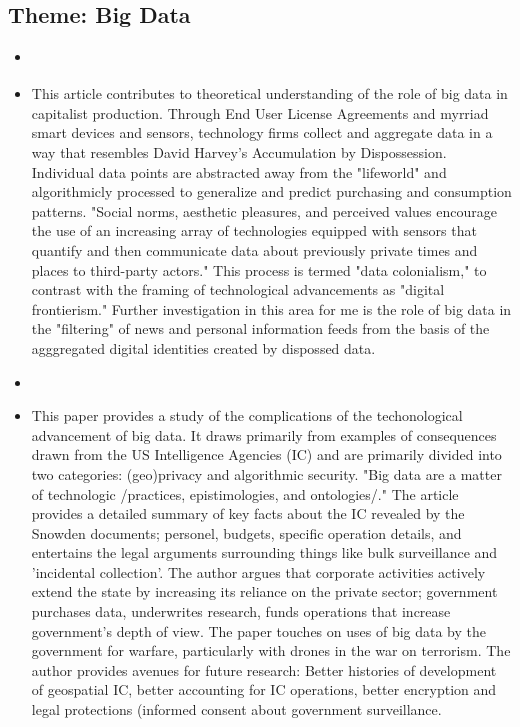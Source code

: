 \documentclass{article} \usepackage{filecontents}
\begin{document}
\subsection{Theme: Big Data}
\begin{itemize}

\item \cite{thatcher2016DataColonialism}
\item This article contributes to theoretical understanding of the
  role of big data in capitalist production. Through End User License
  Agreements and myrriad smart devices and sensors, technology firms
  collect and aggregate data in a way that resembles David Harvey's
  Accumulation by Dispossession. Individual data points are abstracted
  away from the "lifeworld" and algorithmicly processed to generalize
  and predict purchasing and consumption patterns. "Social norms,
  aesthetic pleasures, and perceived values encourage the use of an
  increasing array of technologies equipped with sensors that quantify
  and then communicate data about previously private times and places
  to third-party actors." This process is termed "data colonialism,"
  to contrast with the framing of technological advancements as
  "digital frontierism." Further investigation in this area for me is
  the role of big data in the "filtering" of news and personal
  information feeds from the basis of the agggregated digital
  identities created by dispossed data.

\item \cite{crampton2015CollectIt}
\item This paper provides a study of the complications of the
  techonological advancement of big data. It draws primarily from
  examples of consequences drawn from the US Intelligence Agencies
  (IC) and are primarily divided into two categories: (geo)privacy and
  algorithmic security. "Big data are a matter of technologic
  /practices, epistimologies, and ontologies/." The article provides a
  detailed summary of key facts about the IC revealed by the Snowden
  documents; personel, budgets, specific operation details, and
  entertains the legal arguments surrounding things like bulk
  surveillance and 'incidental collection'. The author argues that
  corporate activities actively extend the state by increasing its
  reliance on the private sector; government purchases data,
  underwrites research, funds operations that increase government's
  depth of view. The paper touches on uses of big data by the
  government for warfare, particularly with drones in the war on
  terrorism. The author provides avenues for future research: Better
  histories of development of geospatial IC, better accounting for IC
  operations, better encryption and legal protections (informed
  consent about government surveillance.
  
\end{itemize}
\end{document}
